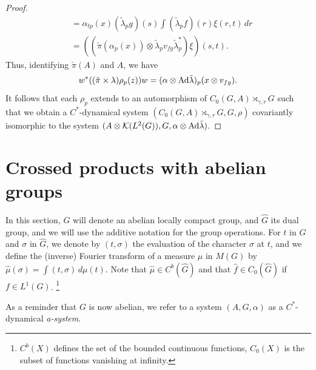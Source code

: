 \documentclass{book}
\begin{document}
\begin{proof}
\begin{align*}
    &=\alpha_{tp}(x)(\tilde{\lambda}_p g)(s)\int(\tilde{\lambda}_p f)(r)\xi(r,t)\,dr\\
    &=((\check{\pi}(\alpha_p(x))\otimes\tilde{\lambda}_p v_{fg}\tilde{\lambda}_p^*)\xi)(s,t).
  \end{align*}
  Thus, identifying \(\check{\pi}(A)\) and \(A\), we have
  \[
    w^*((\tilde{\pi}\times\lambda)\rho_p(z))w=(\alpha\otimes\textnormal{Ad}\tilde{\lambda})_p(x\otimes v_{fg}).
  \]
  It follows that each \(\rho_p\) extends to an automorphism of \(C_0(G,A)\rtimes_{\gamma,r}G\) such that we obtain a \(C^*\)-dynamical system 
  \((C_0(G,A)\rtimes_{\gamma,r}G, G, \rho)\) covariantly isomorphic to the system \((A\otimes\mathcal{K}(L^2(G)),G,\alpha\otimes\textnormal{Ad}\tilde{\lambda})\).
\end{proof}

\section{Crossed products with abelian groups}
In this section, \(G\) will denote an abelian locally compact group, and \(\hat{G}\) its dual
group, and we will use the additive notation for the group operations. For \(t\) in
\(G\) and \(\sigma\) in \(\hat{G}\), we denote by \((t,\sigma)\) the evaluation of the character \(\sigma\) at \(t\), and
we define the (inverse) Fourier transform of a measure \(\mu\) in \(M(G)\) by \(\hat{\mu}(\sigma) =\int(t,\sigma)\,d\mu(t)\). 
Note that \(\hat{\mu} \in C^b( \hat{G})\) and that \(\hat{f} \in C_0(\hat{G})\) if \(f \in L^1(G)\).
\footnote{\(C^b(X)\) defines the set of the bounded continuous functions, \(C_0(X)\) is the subset of functions vanishing at infinity.}\par
As a reminder that \(G\) is now abelian, we refer to a system \((A,G,\alpha)\) as
a \(C^*\)-dynamical \textit{a-system}.
\end{document}
